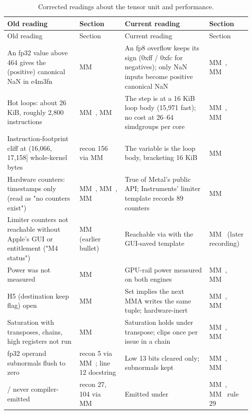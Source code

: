 \begin{xltabular}{\linewidth}{@{}>{\hsize}X>{\hsize}X>{\hsize}X>{\hsize}X@{}}
\caption{Corrected readings about the tensor unit and performance.}\label{tab:corr-tensor-performance}\\
\toprule
Old reading & Section & Current reading & Section \\
\midrule
\endfirsthead
{}
\toprule
Old reading & Section & Current reading & Section \\
\midrule
\endhead
An fp32 value above 464 gives the (positive) canonical NaN in e4m3fn & MM~ & An fp8 overflow keeps its sign (0xff / 0xfc for negatives); only NaN
inputs become positive canonical NaN & MM~, MM~ \\
Hot loops: about 26 KiB, roughly 2,800 instructions & MM~, MM~ & The step is at a 16 KiB loop body (15,971 fast); no cost at 26–64
simdgroups per core & MM~, MM~ \\
Instruction-footprint cliff at (16,066, 17,158{]} whole-kernel bytes & recon 156 via MM~ & The variable is the loop body, bracketing 16 KiB & MM~ \\
Hardware counters: timestamps only (read as "no counters exist") & MM~, MM~, MM~ & True of Metal's public API;
Instruments' limiter template records 89 counters & MM~ \\
Limiter counters not reachable without Apple's GUI or
entitlement ("M4 status") & MM~ (earlier bullet) & Reachable via  with the GUI-saved template & MM~ (later recording) \\
Power was not measured & MM~ & GPU-rail power measured on both engines & MM~, MM~ \\
H5 (destination keep flag) open & MM~ & Set implies the next MMA writes the same tuple; hardware-inert & MM~, MM~ \\
Saturation with transposes, chains, high registers not run & MM~ & Saturation holds under transpose; clips once per issue in a chain & MM~, MM~ \\
fp32 operand subnormals flush to zero & recon 5 via MM~;  line 12 docstring & Low 13 bits cleared only; subnormals kept & MM~, MM~ \\
 /  never compiler-emitted & recon 27, 104 via MM~ & Emitted under  & MM~, MM~ rule 29 \\

\end{xltabular}
